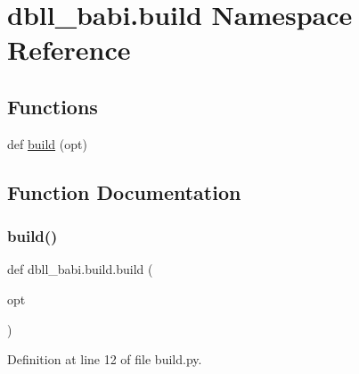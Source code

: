 \hypertarget{namespacedbll__babi_1_1build}{}\section{dbll\+\_\+babi.\+build Namespace Reference}
\label{namespacedbll__babi_1_1build}
\subsection*{Functions}
\begin{DoxyCompactItemize}
\item 
def \hyperlink{namespacedbll__babi_1_1build_a841db6f39b42d47e268ec9a6d4e05458}{build} (opt)
\end{DoxyCompactItemize}


\subsection{Function Documentation}
\mbox{\label{namespacedbll__babi_1_1build_a841db6f39b42d47e268ec9a6d4e05458}} 
\subsubsection{\texorpdfstring{build()}{build()}}
{\footnotesize\ttfamily def dbll\+\_\+babi.\+build.\+build (\begin{DoxyParamCaption}\item[{}]{opt }\end{DoxyParamCaption})}



Definition at line 12 of file build.\+py.

